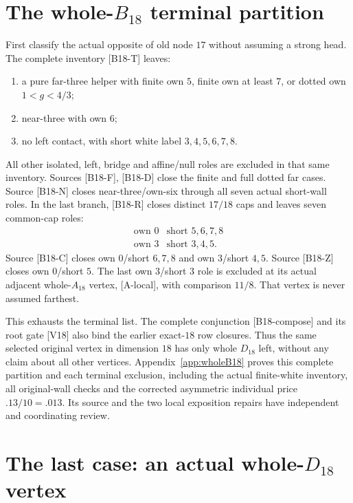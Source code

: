 \documentclass[11pt]{article}
\theoremstyle{definition}
\theoremstyle{remark}
\newcommand{\src}[1]{\textnormal{\textsf{[#1]}}}
\begin{document}
\section{The whole-\(B_{18}\) terminal partition}
\label{sec:b18}
First classify the actual opposite of old node \(17\) without
assuming a strong head. The complete inventory \src{B18-T} leaves:
\begin{enumerate}[label=(\roman*)]
\item a pure far-three helper with finite own \(5\), finite own
 at least \(7\), or dotted own \(1<g<4/3\);
\item near-three with own \(6\);
\item no left contact, with short white label \(3,4,5,6,7,8\).
\end{enumerate}
All other isolated, left, bridge and affine/null roles are
excluded in that same inventory.
Sources \src{B18-F}, \src{B18-D} close the finite and full
dotted far cases. Source \src{B18-N} closes near-three/own-six
through all seven actual short-wall roles.
In the last branch, \src{B18-R} closes distinct \(17/18\)
caps and leaves seven common-cap roles:
\[
\begin{array}{c|c}
\text{own }0&\text{short }5,6,7,8\\
\text{own }3&\text{short }3,4,5.
\end{array}
\]
Source \src{B18-C} closes own \(0\)/short \(6,7,8\) and
own \(3\)/short \(4,5\). Source \src{B18-Z} closes
own \(0\)/short \(5\). The last own \(3\)/short \(3\)
role is excluded at its actual adjacent whole-\(A_{18}\)
vertex, \src{A-local}, with comparison \(11/8\).
That vertex is never assumed farthest.

This exhausts the terminal list. The complete conjunction
\src{B18-compose} and its root gate \src{V18} also bind the
earlier exact-\(18\) row closures. Thus the same selected
original vertex in dimension \(18\) has only whole \(D_{18}\)
left, without any claim about all other vertices.
Appendix~\ref{app:wholeB18} proves this complete partition and each
terminal exclusion, including the actual finite-white inventory,
all original-wall checks and the corrected asymmetric individual
price \(.13/10=.013\). Its source and the two local exposition
repairs have independent and coordinating review.

\section{The last case: an actual whole-\(D_{18}\) vertex}
\label{sec:d18-setup}
\end{document}

